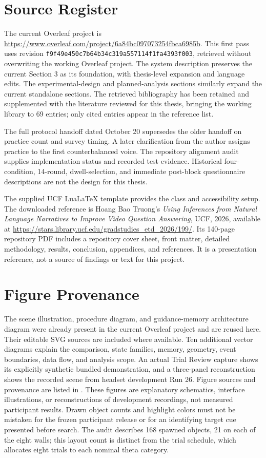 \section{Source Register}
The current Overleaf project is \url{https://www.overleaf.com/project/6a84bc097073254fbca6985b}. This first pass uses revision \texttt{f9f49e450c7b64b34c319a557114f1fa4393f003}, retrieved without overwriting the working Overleaf project. The system description preserves the current Section 3 as its foundation, with thesis-level expansion and language edits. The experimental-design and planned-analysis sections similarly expand the current standalone sections. The retrieved bibliography has been retained and supplemented with the literature reviewed for this thesis, bringing the working library to 69 entries; only cited entries appear in the reference list.

The full protocol handoff dated October 20 supersedes the older handoff on practice count and survey timing. A later clarification from the author assigns practice to the first counterbalanced voice. The repository alignment audit supplies implementation status and recorded test evidence. Historical four-condition, 14-round, dwell-selection, and immediate post-block questionnaire descriptions are not the design for this thesis.

The supplied UCF LuaLaTeX template provides the class and accessibility setup. The downloaded reference is Hoang Bao Truong's \emph{Using Inferences from Natural Language Narratives to Improve Video Question Answering}, UCF, 2026, available at \url{https://stars.library.ucf.edu/gradstudies_etd_2026/199/}. Its 140-page repository PDF includes a repository cover sheet, front matter, detailed methodology, results, conclusion, appendices, and references. It is a presentation reference, not a source of findings or text for this project.

\section{Figure Provenance}
The scene illustration, procedure diagram, and guidance-memory architecture diagram were already present in the current Overleaf project and are reused here. Their editable SVG sources are included where available. Ten additional vector diagrams explain the comparison, state families, memory, geometry, event boundaries, data flow, and analysis scope. An actual Trial Review capture shows its explicitly synthetic bundled demonstration, and a three-panel reconstruction shows the recorded scene from headset development Run 26. Figure sources and provenance are listed in . These figures are explanatory schematics, interface illustrations, or reconstructions of development recordings, not measured participant results. Drawn object counts and highlight colors must not be mistaken for the frozen participant release or for an identifying target cue presented before search. The audit describes 168 spawned objects, 21 on each of the eight walls; this layout count is distinct from the trial schedule, which allocates eight trials to each nominal theta category.

